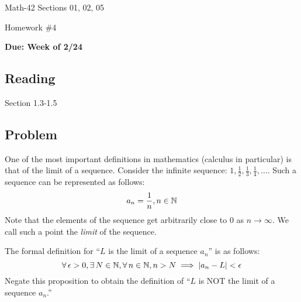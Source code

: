 \documentclass[letterpaper,12pt,fleqn]{article}
\newcommand{\e}{\epsilon}
\begin{document}
\begin{center}
  \large
  Math-42 Sections 01, 02, 05

  \Large
  Homework \#4

  \large
  \textbf{Due: Week of 2/24}
\end{center}

\subsection*{Reading}

Section 1.3-1.5

\subsection*{Problem}

One of the most important definitions in mathematics (calculus in particular) is that of the limit of a sequence.
Consider the infinite sequence: \(1,\frac{1}{2},\frac{1}{3},\frac{1}{4},\ldots\).  Such a sequence can be
represented as follows:
\[a_n=\frac{1}{n}, n\in\mathbb{N}\]
Note that the elements of the sequence get arbitrarily close to \(0\) as \(n\to\infty\).  We call such a point the
\emph{limit} of the sequence.

The formal definition for ``\(L\) is the limit of a sequence \(a_n\)'' is as follows:
\[\forall\,\e>0,\exists\,N\in\N,\forall\,n\in\N,n>N\implies\abs{a_n-L}<\e\]
Negate this proposition to obtain the definition of ``\(L\) is NOT the limit of a sequence \(a_n\).''
\end{document}
